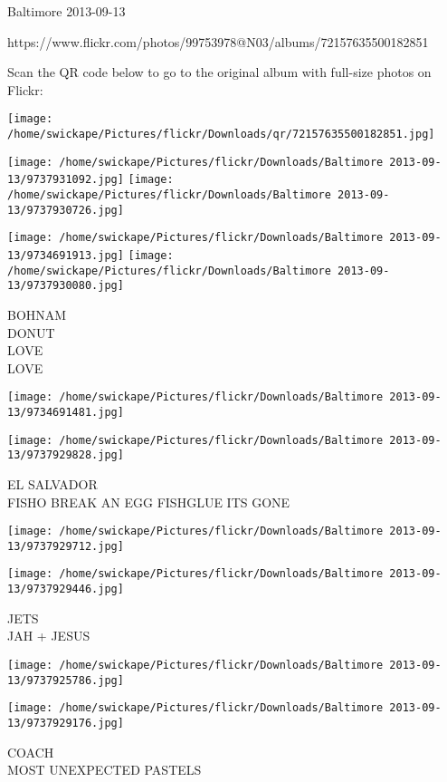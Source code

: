 \documentclass[10pt,letterpaper]{article}
\begin{document}
Baltimore 2013-09-13

https://www.flickr.com/photos/99753978@N03/albums/72157635500182851

Scan the QR code below to go to the original album with full-size photos on Flickr:

\texttt{[image: /home/swickape/Pictures/flickr/Downloads/qr/72157635500182851.jpg]}
\pagebreak

\texttt{[image: /home/swickape/Pictures/flickr/Downloads/Baltimore 2013-09-13/9737931092.jpg]}
\texttt{[image: /home/swickape/Pictures/flickr/Downloads/Baltimore 2013-09-13/9737930726.jpg]}

\texttt{[image: /home/swickape/Pictures/flickr/Downloads/Baltimore 2013-09-13/9734691913.jpg]}
\texttt{[image: /home/swickape/Pictures/flickr/Downloads/Baltimore 2013-09-13/9737930080.jpg]}

BOHNAM\\
DONUT\\
LOVE\\
LOVE
\pagebreak

\texttt{[image: /home/swickape/Pictures/flickr/Downloads/Baltimore 2013-09-13/9734691481.jpg]}

\vspace{0.25in}
\texttt{[image: /home/swickape/Pictures/flickr/Downloads/Baltimore 2013-09-13/9737929828.jpg]}

EL SALVADOR\\
FISHO BREAK AN EGG FISHGLUE ITS GONE
\pagebreak

\texttt{[image: /home/swickape/Pictures/flickr/Downloads/Baltimore 2013-09-13/9737929712.jpg]}

\vspace{0.25in}
\texttt{[image: /home/swickape/Pictures/flickr/Downloads/Baltimore 2013-09-13/9737929446.jpg]}

JETS\\
JAH + JESUS
\pagebreak

\texttt{[image: /home/swickape/Pictures/flickr/Downloads/Baltimore 2013-09-13/9737925786.jpg]}

\vspace{0.25in}
\texttt{[image: /home/swickape/Pictures/flickr/Downloads/Baltimore 2013-09-13/9737929176.jpg]}

COACH\\
MOST UNEXPECTED PASTELS
\pagebreak
\end{document}
